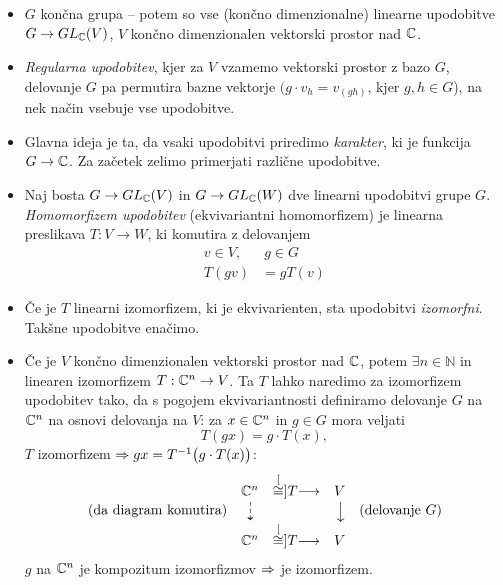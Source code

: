 \begin{itemize}
	\item{$G$ kon\v cna grupa -- potem so vse (kon\v cno dimenzionalne) linearne upodobitve $G \to GL_{\mathbb{C}} (V)$, $V$ kon\v cno
		dimenzionalen vektorski prostor nad $\mathbb{C}$.}
	\item{\emph{Regularna upodobitev}, kjer za $V$ vzamemo vektorski prostor z bazo $G$, delovanje $G$ pa permutira bazne vektorje
		$(g\cdot v_h = v_{(gh)}$, kjer $g,h \in G$), na nek na\v cin vsebuje vse upodobitve.}
	\item{Glavna ideja je ta, da vsaki upodobitvi priredimo \emph{karakter}, ki je funkcija $G \to \mathbb{C}$. Za za\v cetek zelimo
		primerjati razli\v cne upodobitve.}
	\item{Naj bosta $G \to GL_{\mathbb{C}}(V)$ in $G \to GL_{\mathbb{C}}(W)$ dve linearni upodobitvi grupe $G$. {\em Homomorfizem
		upodobitev} (ekvivariantni homomorfizem) je linearna preslikava $T:V \to W$, ki komutira z delovanjem
		\begin{align*}
			v \in V,\ &\ g \in G \\
			T(gv) &= gT(v)
		\end{align*}}
	\item{\v Ce je $T$ linearni izomorfizem, ki je ekvivarienten, sta upodobitvi {\em izomorfni}. Tak\v sne upodobitve
		ena\v cimo.}
	\item{\v Ce je $V$ kon\v cno dimenzionalen vektorski prostor nad $\mathbb{C}$, potem $\exists n \in \mathbb{N}$ in linearen
		izomorfizem $T : \mathbb{C}^n \to V$. Ta $T$ lahko naredimo za izomorfizem upodobitev tako, da s pogojem ekvivariantnosti
		definiramo delovanje $G$ na $\mathbb{C}^n$ na osnovi delovanja na $V$: za $x \in \mathbb{C}^n$ in $g \in G$ mora veljati
		\[
			T(gx) = g\cdot T(x),
		\]
		$T$ izomorfizem $\Rightarrow gx = T^{-1}\big(g \cdot T(x)\big)$:
		\[
			\begin{array}{ccccc}
				& \C^n & \stackrel[\cong]{T}{\longrightarrow} & V &\\
				\text{(da diagram komutira)}& \downdasharrow & & \downarrow & \text{(delovanje $G$)} \\
				& \C^n & \stackrel[\cong]{T}{\longrightarrow} & V &
			\end{array}
		\]
		$g$ na $\mathbb{C}^n$ je kompozitum izomorfizmov $\Rightarrow$ je izomorfizem.}
\end{itemize}

